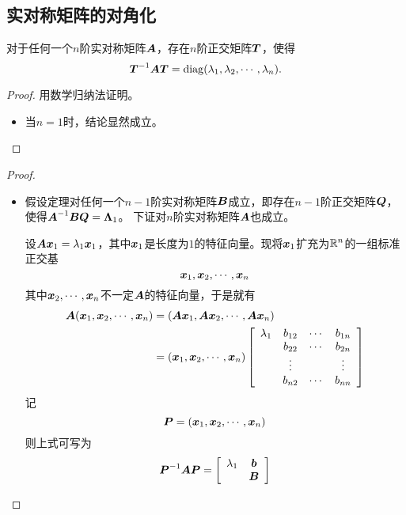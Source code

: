 \subsection{实对称矩阵的对角化}

\begin{frame}
  \begin{dingli}
    对于任何一个$n$阶实对称矩阵$\boldsymbol{A}$，存在$n$阶正交矩阵$\boldsymbol{T}$，使得
    $$
    \boldsymbol{T}^{-1}\boldsymbol{A}\boldsymbol{T}=\mathrm{diag}(\lambda_1,\lambda_2,\cdots,\lambda_n).
    $$
  \end{dingli}\pause 
  \begin{proof}
    用数学归纳法证明。

    \begin{itemize}
      \item 当$n=1$时，结论显然成立。
    \end{itemize}
  \end{proof}
\end{frame}

\begin{frame}
\begin{proof}
    \begin{itemize}
      \item 假设定理对任何一个$n-1$阶实对称矩阵$\boldsymbol{B}$成立，即存在$n-1$阶正交矩阵$\boldsymbol{Q}$，使得$\boldsymbol{A}^{-1}\boldsymbol{B}\boldsymbol{Q}=\boldsymbol{\Lambda}_1$。
        下证对$n$阶实对称矩阵$\boldsymbol{A}$也成立。 \vspace{.1in}\pause 

        设$\boldsymbol{A}{\boldsymbol{x}}_1=\lambda_1{\boldsymbol{x}}_1$，其中${\boldsymbol{x}}_1$是长度为$1$的特征向量。现将${\boldsymbol{x}}_1$扩充为$\mathbb R^n$的一组标准正交基
        $$
        {\boldsymbol{x}}_1,{\boldsymbol{x}}_2,\cdots,{\boldsymbol{x}}_n
        $$
        其中${\boldsymbol{x}}_2,\cdots,{\boldsymbol{x}}_n$不一定$\boldsymbol{A}$的特征向量，于是就有
        $$
        \begin{aligned}
          \boldsymbol{A}({\boldsymbol{x}}_1,{\boldsymbol{x}}_2,\cdots,{\boldsymbol{x}}_n)&=(\boldsymbol{A}{\boldsymbol{x}}_1,\boldsymbol{A}{\boldsymbol{x}}_2,\cdots,\boldsymbol{A}{\boldsymbol{x}}_n)\\
          &=({\boldsymbol{x}}_1,{\boldsymbol{x}}_2,\cdots,{\boldsymbol{x}}_n)\left[
            \begin{array}{cccc}
              \lambda_1&b_{12}&\cdots&b_{1n}\\
                       &b_{22}&\cdots&b_{2n}\\
                       &\vdots   &   &\vdots\\
                       &b_{n2}&\cdots&b_{nn}
            \end{array}
          \right]
        \end{aligned}
        $$
        \pause 
        记
        $$
        \boldsymbol{P}=({\boldsymbol{x}}_1,{\boldsymbol{x}}_2,\cdots,{\boldsymbol{x}}_n)
        $$
        则上式可写为
        $$
        \boldsymbol{P}^{-1}\boldsymbol{A}\boldsymbol{P}=\left[
          \begin{array}{cc}
            \lambda_1&{\boldsymbol{b}}\\
                     &\boldsymbol{B}
          \end{array}
        \right]
        $$
        
    \end{itemize}
  \end{proof}
\end{frame}


